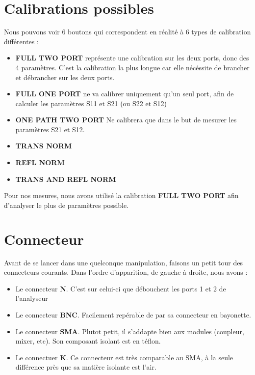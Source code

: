 \documentclass[a4paper,12pt]{report}            %
\begin{document}
\newpage

\section{Calibrations possibles}
Nous pouvons voir 6 boutons qui correspondent en réalité à 6 types de calibration
différentes :
\begin{itemize}
	\item \textbf{FULL TWO PORT} représente une calibration sur les deux ports, donc des 4 paramètres.
	      C'est la calibration la plus longue car elle nécéssite de brancher et débrancher sur les deux ports.
	\item \textbf{FULL ONE PORT} ne va calibrer uniquement qu'un seul port, afin de calculer les paramètres
	      S11 et S21 (ou S22 et S12)
	\item \textbf{ONE PATH TWO PORT} Ne calibrera que dans le but de mesurer les paramètres S21 et S12.
	\item \textbf{TRANS NORM}
	\item \textbf{REFL NORM} 
	\item \textbf{TRANS AND REFL NORM}
\end{itemize}
Pour nos mesures, nous avons utilisé la calibration \textbf{FULL TWO PORT} afin
d'analyser le plus de paramètres possible.  

\section{Connecteur}

Avant de se lancer dans une quelconque manipulation, faisons un petit tour des connecteurs
courants. Dans l'ordre d'apparition, de gauche à droite, nous avons :
\begin{itemize}
	\item Le connecteur \textbf{N}. C'est sur celui-ci que débouchent les ports 1 et 2 de l'analyseur
	\item Le connecteur \textbf{BNC}. Facilement repérable de par sa connecteur en bayonette.
	\item Le connecteur \textbf{SMA}. Plutot petit, il s'addapte bien aux modules (coupleur, mixer, etc). Son
	      composant isolant est en téflon.
	\item Le connectuer \textbf{K}. Ce connecteur est très comparable au SMA, à la seule différence près
	      que sa matière isolante est l'air.
\end{itemize}
\end{document}
